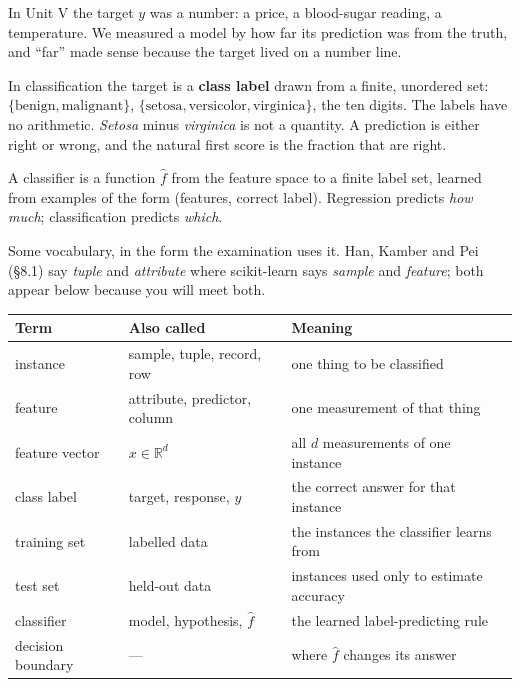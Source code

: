 \documentclass[11pt]{article}
\begin{document}
In Unit V the target $y$ was a number: a price, a blood-sugar reading, a
temperature. We measured a model by how far its prediction was from the truth,
and ``far'' made sense because the target lived on a number line.

In classification the target is a \textbf{class label} drawn from a finite,
unordered set: $\{\text{benign}, \text{malignant}\}$,
$\{\text{setosa}, \text{versicolor}, \text{virginica}\}$, the ten digits. The
labels have no arithmetic. \emph{Setosa} minus \emph{virginica} is not a
quantity. A prediction is either right or wrong, and the natural first score is
the fraction that are right.

\begin{keyidea}
A classifier is a function $\hat{f}$ from the feature space to a finite label
set, learned from examples of the form (features, correct label). Regression
predicts \emph{how much}; classification predicts \emph{which}.
\end{keyidea}

Some vocabulary, in the form the examination uses it. Han, Kamber and Pei
(\S8.1) say \emph{tuple} and \emph{attribute} where scikit-learn says
\emph{sample} and \emph{feature}; both appear below because you will meet both.

\begin{center}\small
\begin{tabular}{@{}lll@{}}
\toprule
\textbf{Term} & \textbf{Also called} & \textbf{Meaning}\\
\midrule
instance & sample, tuple, record, row & one thing to be classified\\
feature & attribute, predictor, column & one measurement of that thing\\
feature vector & $x \in \mathbb{R}^{d}$ & all $d$ measurements of one instance\\
class label & target, response, $y$ & the correct answer for that instance\\
training set & labelled data & the instances the classifier learns from\\
test set & held-out data & instances used only to estimate accuracy\\
classifier & model, hypothesis, $\hat{f}$ & the learned label-predicting rule\\
decision boundary & --- & where $\hat{f}$ changes its answer\\
\bottomrule
\end{tabular}
\end{center}
\end{document}
